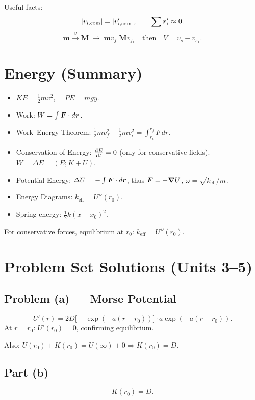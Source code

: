 Useful facts:
\[
    |v_{i,\text{com}}| = |v_{i,\text{com}}'|, \qquad \sum \bm{r}_i' \approx 0.
\]
\[
    \bm{m} \xrightarrow{v} \bm{M} \;\to\; \bm{m} v_f \;\bm{M} v_{f_1} \quad \text{then} \quad V = v_s - v_{s_1}.
\]

\section{Energy (Summary)}

\begin{itemize}
    \item $KE = \tfrac{1}{2}mv^2$, $\quad PE = mgy$.
    \item Work: $W = \int \vect{F}\cdot d\lvect{r}$.
    \item Work–Energy Theorem: $\tfrac{1}{2}mv_f^2 - \tfrac{1}{2}mv_i^2 = \int_{r_i}^{r_f} F\,dr$.
    \item Conservation of Energy: $\dv{E}{t} = 0$ (only for conservative fields). $W = \Delta E = (E; K+U)$.
    \item Potential Energy: $\Delta U = -\int \vect{F}\cdot d\lvect{r}$, thus $\vect{F} = -\grad U$, $\omega = \sqrt{k_{\text{eff}}/m}$.
    \item Energy Diagrams: $k_{\text{eff}} = U''(r_0)$.
    \item Spring energy: $\tfrac{1}{2}k(x-x_0)^2$.
\end{itemize}

For conservative forces, equilibrium at $r_0$: $k_{\text{eff}} = U''(r_0)$.

\section{Problem Set Solutions (Units 3--5)}

\subsection*{Problem (a) — Morse Potential}

\[
    U'(r) = 2D\bigl[-\exp(-a(r-r_0))\bigr]\cdot a\exp(-a(r-r_0)).
\]
At $r = r_0$: $U'(r_0) = 0$, confirming equilibrium.

Also: $U(r_0) + K(r_0) = U(\infty) + 0 \Rightarrow K(r_0) = D$.

\subsection*{Part (b)}
\[
    K(r_0) = D.
\]

